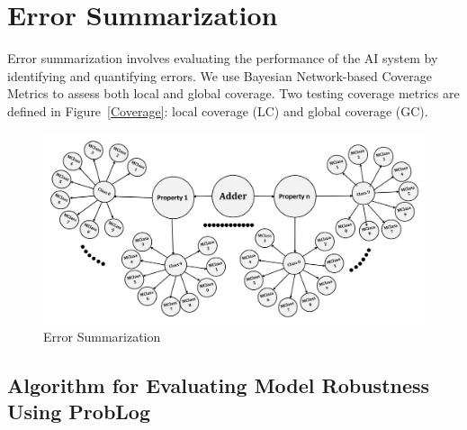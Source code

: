


\section{Error Summarization}

Error summarization involves evaluating the performance of the AI system by identifying and quantifying errors. We use Bayesian Network-based Coverage Metrics to assess both local and global coverage. Two testing coverage metrics are defined in Figure~\ref{Coverage}: local coverage (LC) and global coverage (GC).

\begin{figure}[h]
    \centering
    \includegraphics[width=\textwidth]{figures/step5.pdf}
    \caption{Error Summarization}
    \label{Summarization}
\end{figure}



\subsection{Algorithm for Evaluating Model Robustness Using ProbLog}

